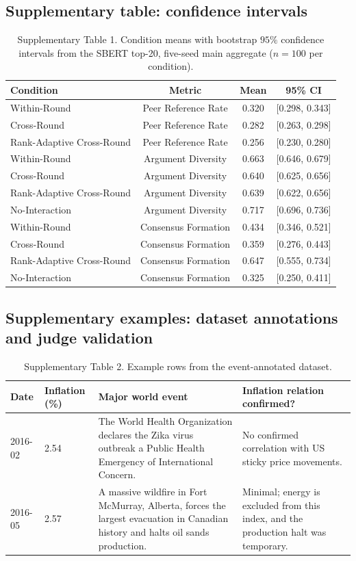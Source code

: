 \documentclass[11pt]{article}
\begin{document}
\subsection{Supplementary table: confidence intervals}
\begin{table}[H]
\caption{Supplementary Table 1. Condition means with bootstrap $95\%$ confidence intervals from the SBERT top-20, five-seed main aggregate ($n=100$ per condition).}
\label{tab:supp_ci}
\begin{tabular}{lccc}
\hline
Condition & Metric & Mean & 95\% CI \\
\midrule
Within-Round & Peer Reference Rate & 0.320 & [0.298, 0.343] \\
Cross-Round & Peer Reference Rate & 0.282 & [0.263, 0.298] \\
Rank-Adaptive Cross-Round & Peer Reference Rate & 0.256 & [0.230, 0.280] \\
Within-Round & Argument Diversity & 0.663 & [0.646, 0.679] \\
Cross-Round & Argument Diversity & 0.640 & [0.625, 0.656] \\
Rank-Adaptive Cross-Round & Argument Diversity & 0.639 & [0.622, 0.656] \\
No-Interaction & Argument Diversity & 0.717 & [0.696, 0.736] \\
Within-Round & Consensus Formation & 0.434 & [0.346, 0.521] \\
Cross-Round & Consensus Formation & 0.359 & [0.276, 0.443] \\
Rank-Adaptive Cross-Round & Consensus Formation & 0.647 & [0.555, 0.734] \\
No-Interaction & Consensus Formation & 0.325 & [0.250, 0.411] \\
\bottomrule
\end{tabular}
\end{table}

\subsection{Supplementary examples: dataset annotations and judge validation}

\begin{table}[H]
\caption{Supplementary Table 2. Example rows from the event-annotated dataset.}
\label{tab:event_examples}
\begin{tabular}{p{1.6cm}p{1.3cm}p{6.6cm}p{5.0cm}}
\hline
Date & Inflation (\%) & Major world event & Inflation relation confirmed? \\
\midrule
2016-02 & 2.54 & The World Health Organization declares the Zika virus outbreak a Public Health Emergency of International Concern. & No confirmed correlation with US sticky price movements. \\
2016-05 & 2.57 & A massive wildfire in Fort McMurray, Alberta, forces the largest evacuation in Canadian history and halts oil sands production. & Minimal; energy is excluded from this index, and the production halt was temporary. \\
\bottomrule
\end{tabular}
\end{table}
\end{document}
